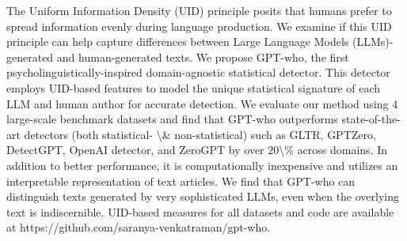 The Uniform Information Density (UID) principle posits that humans prefer to spread information evenly during language production. We examine if this UID principle can help capture differences between Large Language Models (LLMs)-generated and human-generated texts. We propose GPT-who, the first psycholinguistically-inspired domain-agnostic statistical detector. This detector employs UID-based features to model the unique statistical signature of each LLM and human author for accurate detection.  We evaluate our method using 4 large-scale benchmark datasets and find that GPT-who outperforms state-of-the-art detectors (both statistical- \textbackslash{}\& non-statistical) such as GLTR, GPTZero, DetectGPT, OpenAI detector, and ZeroGPT by over $20$\textbackslash{}\% across domains. In addition to better performance,  it is computationally inexpensive and utilizes an interpretable representation of text articles. We find that GPT-who can distinguish texts generated by very sophisticated LLMs, even when the overlying text is indiscernible. UID-based measures for all datasets and code are available at https://github.com/saranya-venkatraman/gpt-who.
